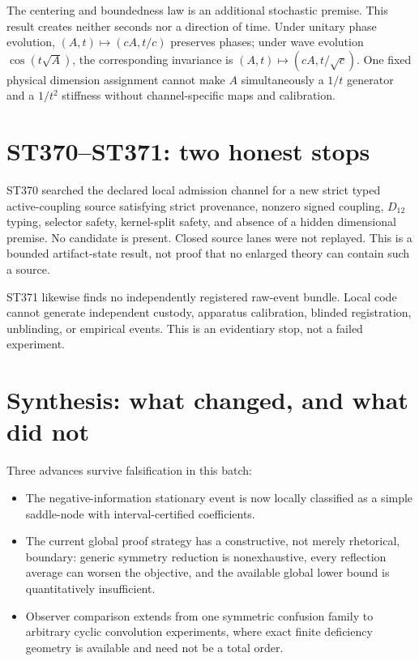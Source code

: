 \documentclass[11pt,a4paper]{article}
\begin{document}
The centering and boundedness law is an additional stochastic premise. This result creates
neither seconds nor a direction of time. Under unitary phase evolution, $(A,t)\mapsto
(cA,t/c)$ preserves phases; under wave evolution $\cos(t\sqrt A)$, the corresponding
invariance is $(A,t)\mapsto(cA,t/\sqrt c)$. One fixed physical dimension assignment cannot
make $A$ simultaneously a $1/t$ generator and a $1/t^2$ stiffness without channel-specific
maps and calibration.

\section{ST370--ST371: two honest stops}

ST370 searched the declared local admission channel for a new strict typed active-coupling
source satisfying strict provenance, nonzero signed coupling, $D_{12}$ typing, selector
safety, kernel-split safety, and absence of a hidden dimensional premise. No candidate is
present. Closed source lanes were not replayed. This is a bounded artifact-state result,
not proof that no enlarged theory can contain such a source.

ST371 likewise finds no independently registered raw-event bundle. Local code cannot
generate independent custody, apparatus calibration, blinded registration, unblinding, or
empirical events. This is an evidentiary stop, not a failed experiment.

\section{Synthesis: what changed, and what did not}

Three advances survive falsification in this batch:
\begin{itemize}
\item The negative-information stationary event is now locally classified as a simple
saddle-node with interval-certified coefficients.
\item The current global proof strategy has a constructive, not merely rhetorical,
boundary: generic symmetry reduction is nonexhaustive, every reflection average can worsen
the objective, and the available global lower bound is quantitatively insufficient.
\item Observer comparison extends from one symmetric confusion family to arbitrary cyclic
convolution experiments, where exact finite deficiency geometry is available and need not
be a total order.
\end{itemize}
\end{document}
